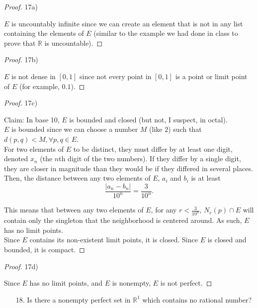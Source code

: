 \documentclass[10pt]{article}
\theoremstyle{definition}
\theoremstyle{plain}
\newcommand{\R}{\mathbb{R}}
\begin{document}
\begin{proof}
17a)

$E$ is uncountably infinite since we can create an element that is not in any list containing the elements of $E$ (similar to the example we had done in class to prove that $\R$ is uncountable).
\end{proof}

\begin{proof}
17b)

$E$ is not dense in $[0,1]$ since not every point in $[0,1]$ is a point or limit point of $E$ (for example, $0.1$).
\end{proof}

\begin{proof}
17c)

Claim: In base 10, $E$ is bounded and closed (but not, I suspect, in octal). \\

$E$ is bounded since we can choose a number $M$ (like $2$) such that $d(p,q) < M, \forall p,q\in E$. \\

For two elements of $E$ to be distinct, they must differ by at least one digit, denoted $x_n$ (the $n$th digit of the two numbers). If they differ by a single digit, they are closer in magnitude than they would be if they differed in several places. Then, the distance between any two elements of $E$, $a_i$ and $b_i$ is at least
$$\frac{|a_n - b_n|}{10^n} = \frac{3}{10^n}.$$

This means that between any two elements of $E$, for any $r < \frac{3}{10^n}$, $N_r(p)\cap E$ will contain only the singleton that the neighborhood is centered around. As such, $E$ has no limit points. \\

Since $E$ contains its non-existent limit points, it is closed. Since $E$ is closed and bounded, it is compact.
\end{proof}

\begin{proof}
17d)

Since $E$ has no limit points, and $E$ is nonempty, $E$ is not perfect.
\end{proof}




\pagebreak




\begin{enumerate}
\item[18.] Is there a nonempty perfect set in $\R^1$ which contains no rational number?
\end{enumerate}
\end{document}
